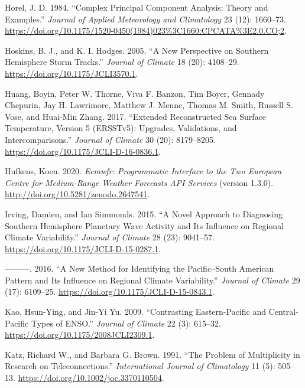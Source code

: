 \documentclass[smallextended]{svjour3}       %
\newlength{\cslhangindent}
\newlength{\cslentryspacingunit} %
\newenvironment{CSLReferences}[2] %
 {%
  \setlength{\parindent}{0pt}
  \ifodd #1
  \let\oldpar\par
  \def\par{\hangindent=\cslhangindent\oldpar}
  \fi
  \setlength{\parskip}{#2\cslentryspacingunit}
 }%
 {}
\begin{document}
\begin{CSLReferences}{1}{0}
\leavevmode{}%
Horel, J. D. 1984. {``Complex {Principal Component Analysis}: {Theory} and {Examples}.''} \emph{Journal of Applied Meteorology and Climatology} 23 (12): 1660--73. \url{https://doi.org/10.1175/1520-0450(1984)023\%3C1660:CPCATA\%3E2.0.CO;2}.

\leavevmode{}%
Hoskins, B. J., and K. I. Hodges. 2005. {``A {New Perspective} on {Southern Hemisphere Storm Tracks}.''} \emph{Journal of Climate} 18 (20): 4108--29. \url{https://doi.org/10.1175/JCLI3570.1}.

\leavevmode{}%
Huang, Boyin, Peter W. Thorne, Viva F. Banzon, Tim Boyer, Gennady Chepurin, Jay H. Lawrimore, Matthew J. Menne, Thomas M. Smith, Russell S. Vose, and Huai-Min Zhang. 2017. {``Extended {Reconstructed Sea Surface Temperature}, {Version} 5 ({ERSSTv5}): {Upgrades}, {Validations}, and {Intercomparisons}.''} \emph{Journal of Climate} 30 (20): 8179--8205. \url{https://doi.org/10.1175/JCLI-D-16-0836.1}.

\leavevmode{}%
Hufkens, Koen. 2020. \emph{Ecmwfr: {Programmatic} Interface to the Two {European Centre} for {Medium-Range Weather Forecasts API} Services} (version 1.3.0). \url{http://doi.org/10.5281/zenodo.2647541}.

\leavevmode{}%
Irving, Damien, and Ian Simmonds. 2015. {``A {Novel Approach} to {Diagnosing Southern Hemisphere Planetary Wave Activity} and {Its Influence} on {Regional Climate Variability}.''} \emph{Journal of Climate} 28 (23): 9041--57. \url{https://doi.org/10.1175/JCLI-D-15-0287.1}.

\leavevmode{}%
---------. 2016. {``A {New Method} for {Identifying} the {Pacific}--{South American Pattern} and {Its Influence} on {Regional Climate Variability}.''} \emph{Journal of Climate} 29 (17): 6109--25. \url{https://doi.org/10.1175/JCLI-D-15-0843.1}.

\leavevmode{}%
Kao, Hsun-Ying, and Jin-Yi Yu. 2009. {``Contrasting {Eastern-Pacific} and {Central-Pacific Types} of {ENSO}.''} \emph{Journal of Climate} 22 (3): 615--32. \url{https://doi.org/10.1175/2008JCLI2309.1}.

\leavevmode{}%
Katz, Richard W., and Barbara G. Brown. 1991. {``The Problem of Multiplicity in Research on Teleconnections.''} \emph{International Journal of Climatology} 11 (5): 505--13. \url{https://doi.org/10.1002/joc.3370110504}.


\end{CSLReferences}
\end{document}
